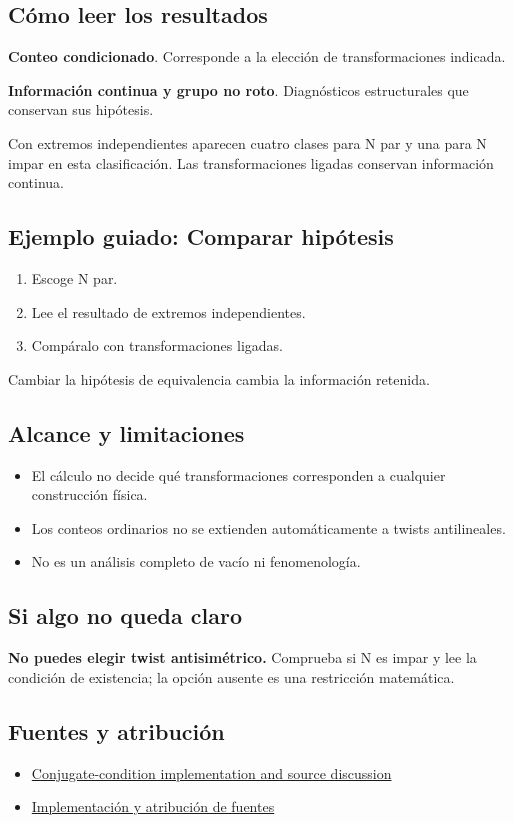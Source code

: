 \documentclass[11pt,a4paper]{article}
\begin{document}
\subsection*{Cómo leer los resultados}
\textbf{Conteo condicionado}. Corresponde a la elección de transformaciones indicada.

\textbf{Información continua y grupo no roto}. Diagnósticos estructurales que conservan sus hipótesis.

Con extremos independientes aparecen cuatro clases para N par y una para N impar en esta clasificación. Las transformaciones ligadas conservan información continua.
\subsection*{Ejemplo guiado: Comparar hipótesis}
\begin{enumerate}
\item Escoge N par.
\item Lee el resultado de extremos independientes.
\item Compáralo con transformaciones ligadas.
\end{enumerate}
Cambiar la hipótesis de equivalencia cambia la información retenida.
\subsection*{Alcance y limitaciones}
\begin{itemize}
\item El cálculo no decide qué transformaciones corresponden a cualquier construcción física.
\item Los conteos ordinarios no se extienden automáticamente a twists antilineales.
\item No es un análisis completo de vacío ni fenomenología.
\end{itemize}
\subsection*{Si algo no queda claro}
\textbf{No puedes elegir twist antisimétrico.} Comprueba si N es impar y lee la condición de existencia; la opción ausente es una restricción matemática.

\subsection*{Fuentes y atribución}
\begin{itemize}
\item \href{https://github.com/karlesmarin/ghu-lab/blob/main/src/modules/cbclass.mjs}{Conjugate-condition implementation and source discussion}
\item \href{https://github.com/karlesmarin/ghu-lab/blob/main/src/sections/cbclass_section.js}{Implementación y atribución de fuentes}
\end{itemize}
\end{document}
